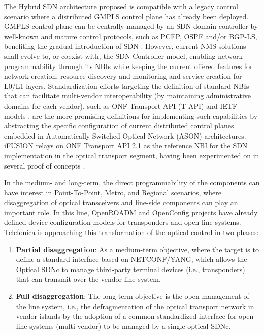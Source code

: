 \documentclass[a4paper,fleqn]{cas-dc}
\begin{document}
The Hybrid SDN architecture proposed is compatible with a legacy control scenario where a distributed GMPLS control plane has already been deployed. GMPLS control plane can be centrally managed by an SDN domain controller by well-known and mature control protocols, such as PCEP, OSPF and/or BGP-LS, benefiting the gradual introduction of SDN \cite{lopez2018control}. However, current NMS solutions shall evolve to, or coexist with, the SDN Controller model, enabling network programmability through its NBIs while keeping the current offered features for network creation, resource discovery and monitoring and service creation for L0/L1 layers. Standardization efforts targeting the definition of standard NBIs that can facilitate multi-vendor interoperability (by maintaining administrative domains for each vendor), such as ONF Transport API (T-API) \cite{lopez2016transport} and IETF models \cite{wu2017service}, are the more promising definitions for implementing such capabilities by abstracting the specific configuration of current distributed control planes embedded in Automatically Switched Optical Network (ASON) architectures. 
iFUSION relays on ONF Transport API 2.1 as the reference NBI for the SDN implementation in the optical transport segment, having been experimented on in several proof of concepts \cite{mayoral2016first,mayoral2017control,bravalheri2019vnf}. 

In the medium- and long-term, the direct programmability of the components can have interest in Point-To-Point, Metro, and Regional scenarios, where disaggregation of optical transceivers and line-side components can play an important role. In this line, OpenROADM \cite{oda2016learning,kundrat2019opening} and OpenConfig \cite{Openconfig,shaikhopenconfig} projects have already defined device configuration models for transponders and open line systems. Telefonica is approaching this transformation of the optical control in two phases:

\begin{enumerate}
    \item \textbf{Partial disaggregation}: As a medium-term objective, where the target is to define a standard interface based on NETCONF/YANG, which allows the Optical SDNc to manage third-party terminal devices (i.e., transponders) that can transmit over the vendor line system.
    
    \item \textbf{Full disaggregation}: The long-term objective is the open management of the line system, i.e., the defragmentation of the optical transport network in vendor islands by the adoption of a common standardized interface for open line systems (multi-vendor) to be managed by a single optical SDNc.
\end{enumerate}
\end{document}
